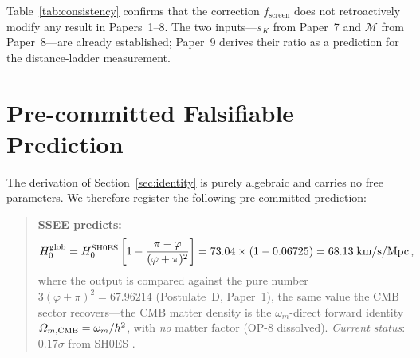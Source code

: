 \documentclass[12pt,a4paper]{article}
\newcommand{\phiG}{\varphi}
\newcommand{\MIRA}{\mathcal{M}}
\newcommand{\fsc}{f_{\mathrm{screen}}}
\newcommand{\sK}{s_K}          %
\renewcommand{\Omega}{\varOmega}
\begin{document}
Table~\ref{tab:consistency} confirms that the correction $\fsc$ does not
retroactively modify any result in Papers~1--8.
The two inputs---$\sK$ from Paper~7 and $\MIRA$ from Paper~8---are
already established; Paper~9 derives their ratio as a prediction for
the distance-ladder measurement.

\section{Pre-committed Falsifiable Prediction}
\label{sec:prediction}

The derivation of Section~\ref{sec:identity} is purely algebraic and carries
no free parameters.
We therefore register the following pre-committed prediction:

\begin{quote}
\textbf{SSEE predicts:}
\begin{equation}
  H_0^{\rm glob} = H_0^{\rm SH0ES}\left[1-\frac{\pi-\phiG}{(\phiG+\pi)^2}\right]
  = 73.04\times(1-0.06725) = 68.13\;\text{km/s/Mpc}\,,
  \label{eq:prediction}
\end{equation}
where the output is compared against the pure number
$3(\phiG+\pi)^2=67.96214$ (Postulate~D, Paper~1), the same value the CMB sector
recovers---the
CMB matter density is the $\omega_m$-direct forward identity
$\Omega_{m,\rm CMB}=\omega_m/h^2$, with \emph{no} matter factor (OP-8 dissolved).
\textit{Current status}: $0.17\sigma$ from SH0ES \citep{Riess2022}.
\end{quote}
\end{document}

